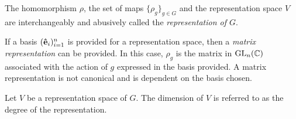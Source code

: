 \begin{note}
	The homomorphism $\rho$, the set of maps $\{\rho_g\}_{g \in G}$ and the representation space $V$ are interchangeably and abusively called the \textit{representation of $G$}.
\end{note}


If a basis $(\mathbf{\hat{e}}_i)_{i=1}^n$ is provided for a representation space, then a \textit{matrix representation} can be provided. In this case, $\rho_g$ is the matrix in $\text{GL}_n(\mathbb{C})$ associated with the action of $g$ expressed in the basis provided. A matrix representation is not canonical and is dependent on the basis chosen.

\begin{definition}
	Let $V$ be a representation space of $G$. The dimension of $V$ is referred to as the degree of the representation.
\end{definition}